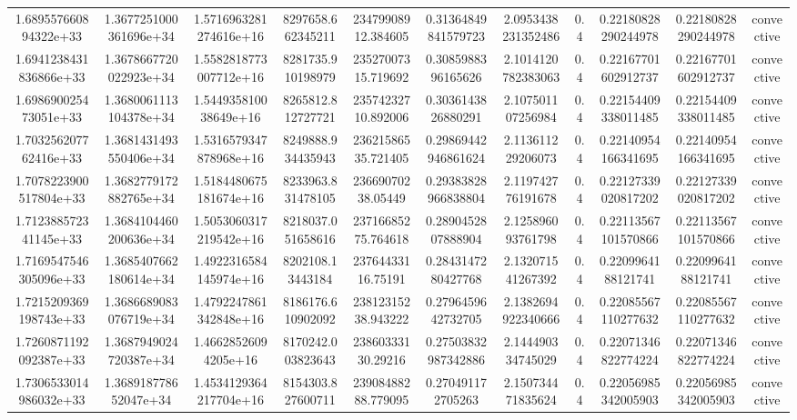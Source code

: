 \begin{table}
\begin{tabular}{ccccccccccc}
1.689557660894322e+33 & 1.3677251000361696e+34 & 1.5716963281274616e+16 & 8297658.662345211 & 23479908912.384605 & 0.31364849841579723 & 2.0953438231352486 & 0.4 & 0.22180828290244978 & 0.22180828290244978 & convective \\
1.6941238431836866e+33 & 1.3678667720022923e+34 & 1.5582818773007712e+16 & 8281735.910198979 & 23527007315.719692 & 0.3085988396165626 & 2.1014120782383063 & 0.4 & 0.22167701602912737 & 0.22167701602912737 & convective \\
1.698690025473051e+33 & 1.3680061113104378e+34 & 1.544935810038649e+16 & 8265812.812727721 & 23574232710.892006 & 0.3036143826880291 & 2.107501107256984 & 0.4 & 0.22154409338011485 & 0.22154409338011485 & convective \\
1.703256207762416e+33 & 1.3681431493550406e+34 & 1.5316579347878968e+16 & 8249888.934435943 & 23621586535.721405 & 0.29869442946861624 & 2.113611229206073 & 0.4 & 0.22140954166341695 & 0.22140954166341695 & convective \\
1.7078223900517804e+33 & 1.3682779172882765e+34 & 1.5184480675181674e+16 & 8233963.831478105 & 23669070238.05449 & 0.29383828966838804 & 2.119742776191678 & 0.4 & 0.22127339020817202 & 0.22127339020817202 & convective \\
1.712388572341145e+33 & 1.3684104460200636e+34 & 1.5053060317219542e+16 & 8218037.051658616 & 23716685275.764618 & 0.2890452807888904 & 2.125896093761798 & 0.4 & 0.22113567101570866 & 0.22113567101570866 & convective \\
1.7169547546305096e+33 & 1.3685407662180614e+34 & 1.4922316584145974e+16 & 8202108.13443184 & 23764433116.75191 & 0.2843147280427768 & 2.132071541267392 & 0.4 & 0.2209964188121741 & 0.2209964188121741 & convective \\
1.7215209369198743e+33 & 1.3686689083076719e+34 & 1.4792247861342848e+16 & 8186176.610902092 & 23812315238.943222 & 0.2796459642732705 & 2.1382694922340666 & 0.4 & 0.22085567110277632 & 0.22085567110277632 & convective \\
1.7260871192092387e+33 & 1.3687949024720387e+34 & 1.46628526094205e+16 & 8170242.003823643 & 23860333130.29216 & 0.27503832987342886 & 2.144490334745029 & 0.4 & 0.22071346822774224 & 0.22071346822774224 & convective \\
1.7306533014986032e+33 & 1.368918778652047e+34 & 1.4534129364217704e+16 & 8154303.827600711 & 23908488288.779095 & 0.270491172705263 & 2.150734471835624 & 0.4 & 0.22056985342005903 & 0.22056985342005903 & convective \\

\end{tabular}
\end{table}
